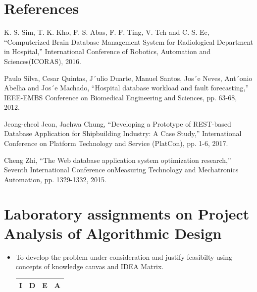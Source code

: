 \documentclass[oneside,a4paper,12pt]{book}
\begin{document}
\begin{appendices}

\chapter{References}

\begin{enumerate}[{[1]}]
\item K. S. Sim, T. K. Kho, F. S. Abas, F. F. Ting, V. Teh and C. S. Ee, “Computerized Brain Database Management System for Radiological Department in Hospital,” International Conference of Robotics, Automation and Sciences(ICORAS), 2016.
\item Paulo Silva, Cesar Quintas, J´ulio Duarte, Manuel Santos, Jos´e Neves, Ant´onio Abelha and Jos´e Machado, “Hospital database workload and fault forecasting,” IEEE-EMBS Conference on Biomedical Engineering and Sciences, pp. 63-68, 2012.
\item Jeong-cheol Jeon, Jaehwa Chung, “Developing a Prototype of REST-based Database Application for Shipbuilding Industry: A Case Study,” International Conference on Platform Technology and Service (PlatCon), pp. 1-6, 2017.
\item Cheng Zhi, “The Web database application system optimization research,” Seventh International Conference onMeasuring Technology and Mechatronics Automation, pp. 1329-1332, 2015.
\end{enumerate}


\chapter{Laboratory assignments on Project Analysis of Algorithmic Design}
\begin{itemize}
\item To develop the problem under consideration and justify feasibilty using
concepts of knowledge canvas and IDEA Matrix.\\


\begin{table}[!htbp]
\begin{center}
  
  \begin{tabular}{|p{3cm}| p{3cm}|p{3cm}|p{3cm}|}
\hline
 I & D & E & A \\ 
\hline


\end{tabular}
\end{center}
\end{table}
\end{itemize}
\end{appendices}
\end{document}
